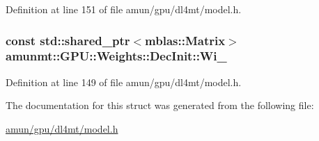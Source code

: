 Definition at line 151 of file amun/gpu/dl4mt/model.\+h.

\subsubsection[{\texorpdfstring{Wi\+\_\+}{Wi_}}]{\setlength{\rightskip}{0pt plus 5cm}const std\+::shared\+\_\+ptr$<${\bf mblas\+::\+Matrix}$>$ amunmt\+::\+G\+P\+U\+::\+Weights\+::\+Dec\+Init\+::\+Wi\+\_\+}\hypertarget{structamunmt_1_1GPU_1_1Weights_1_1DecInit_a5b347c65f13d8b61168770d2a3cfd439}{}\label{structamunmt_1_1GPU_1_1Weights_1_1DecInit_a5b347c65f13d8b61168770d2a3cfd439}


Definition at line 149 of file amun/gpu/dl4mt/model.\+h.



The documentation for this struct was generated from the following file\+:\begin{DoxyCompactItemize}
\item 
\hyperlink{amun_2gpu_2dl4mt_2model_8h}{amun/gpu/dl4mt/model.\+h}\end{DoxyCompactItemize}
